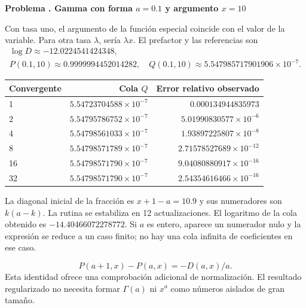 \documentclass[11pt,a4paper]{article}
\theoremstyle{definition}
\newcounter{problema}
\newenvironment{resuelto}[1]{\refstepcounter{problema}\par\medskip\Needspace{6\baselineskip}\textbf{Problema \theproblema. #1}\par}{\par\medskip}
\begin{document}
\begin{resuelto}{Gamma con forma $a=0.1$ y argumento $x=10$}
Con tasa uno, el argumento de la función especial coincide con el valor de la variable. Para otra tasa $\lambda$, sería $\lambda x$. El prefactor y las referencias son
\[
\begin{gathered}
\log D\approx-12.0224541424348,\\
P(0.1,10)\approx0.9999994452014282,\quad Q(0.1,10)\approx5.547985717901906\times10^{-7}.
\end{gathered}
\]

\begin{center}\small\begin{tabular}{lrr}
\toprule
Convergente & Cola $Q$ & Error relativo observado\\\midrule
1 & $5.54723704588\times10^{-7}$ & $0.000134944835973$\\
2 & $5.54795786752\times10^{-7}$ & $5.01990830577\times10^{-6}$\\
4 & $5.54798561033\times10^{-7}$ & $1.93897225807\times10^{-8}$\\
8 & $5.54798571789\times10^{-7}$ & $2.71578527689\times10^{-12}$\\
16 & $5.54798571790\times10^{-7}$ & $9.04080880917\times10^{-16}$\\
32 & $5.54798571790\times10^{-7}$ & $2.54354616466\times10^{-16}$\\
\bottomrule\end{tabular}\end{center}

La diagonal inicial de la fracción es $x+1-a=10.9$ y sus numeradores son $k(a-k)$. La rutina se estabiliza en 12 actualizaciones. El logaritmo de la cola obtenido es $-14.40466072278772$.
Si $a$ es entero, aparece un numerador nulo y la expresión se reduce a un caso finito; no hay una cola infinita de coeficientes en ese caso.

\[
P(a+1,x)-P(a,x)=-D(a,x)/a.
\]
Esta identidad ofrece una comprobación adicional de normalización. El resultado regularizado no necesita formar $\Gamma(a)$ ni $x^a$ como números aislados de gran tamaño.
\end{resuelto}
\end{document}
